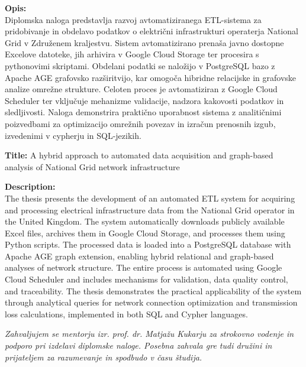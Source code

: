 \documentclass[a4paper,12pt,openright]{book}
\newcommand{\clearemptydoublepage}{\newpage{\pagestyle{empty}\cleardoublepage}}
\begin{document}
\bigskip
\noindent\textbf{Opis:}\\
Diplomska naloga predstavlja razvoj avtomatiziranega ETL-sistema za pridobivanje in obdelavo podatkov o električni infrastrukturi operaterja National Grid v Združenem kraljestvu. Sistem avtomatizirano prenaša javno dostopne Excelove datoteke, jih arhivira v Google Cloud Storage ter procesira s pythonovimi skriptami. Obdelani podatki se naložijo v PostgreSQL bazo z Apache AGE grafovsko razširitvijo, kar omogoča hibridne relacijske in grafovske analize omrežne strukture. Celoten proces je avtomatiziran z Google Cloud Scheduler ter vključuje mehanizme validacije, nadzora kakovosti podatkov in sledljivosti. Naloga demonstrira praktično uporabnost sistema z analitičnimi poizvedbami za optimizacijo omrežnih povezav in izračun prenosnih izgub, izvedenimi v cypherju in  SQL-jezikih.
\pagebreak
\pagebreak
\bigskip

\noindent\textbf{Title:} A hybrid approach to automated data acquisition and graph-based analysis of National Grid network infrastructure  

\bigskip
\noindent\textbf{Description:}\\
The thesis presents the development of an automated ETL system for acquiring and processing electrical infrastructure data from the National Grid operator in the United Kingdom. The system automatically downloads publicly available Excel files, archives them in Google Cloud Storage, and processes them using Python scripts. The processed data is loaded into a PostgreSQL database with Apache AGE graph extension, enabling hybrid relational and graph-based analyses of network structure. The entire process is automated using Google Cloud Scheduler and includes mechanisms for validation, data quality control, and traceability. The thesis demonstrates the practical applicability of the system through analytical queries for network connection optimization and transmission loss calculations, implemented in both SQL and Cypher languages.

\vfill

\vspace{2cm}

\clearemptydoublepage

\thispagestyle{empty}\mbox{}\vfill\null\it%
\noindent
Zahvaljujem se mentorju izr. prof. dr. Matjažu Kukarju za strokovno vodenje in podporo pri izdelavi diplomske naloge. Posebna zahvala gre tudi družini in prijateljem za razumevanje in spodbudo v času študija.
\rm\normalfont
\end{document}
